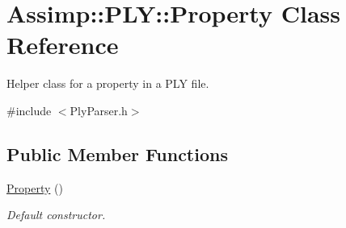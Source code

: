 \hypertarget{class_assimp_1_1_p_l_y_1_1_property}{\section{Assimp\+:\+:P\+L\+Y\+:\+:Property Class Reference}
\label{class_assimp_1_1_p_l_y_1_1_property}
}


Helper class for a property in a P\+L\+Y file.  




{\ttfamily \#include $<$Ply\+Parser.\+h$>$}

\subsection*{Public Member Functions}
\begin{DoxyCompactItemize}
\item 
\hypertarget{class_assimp_1_1_p_l_y_1_1_property_a939c4da233c972ad53b83229ed4f88f4}{\hyperlink{class_assimp_1_1_p_l_y_1_1_property_a939c4da233c972ad53b83229ed4f88f4}{Property} ()}\label{class_assimp_1_1_p_l_y_1_1_property_a939c4da233c972ad53b83229ed4f88f4}

\begin{DoxyCompactList}\small\item\em Default constructor. \end{DoxyCompactList}\end{DoxyCompactItemize}
